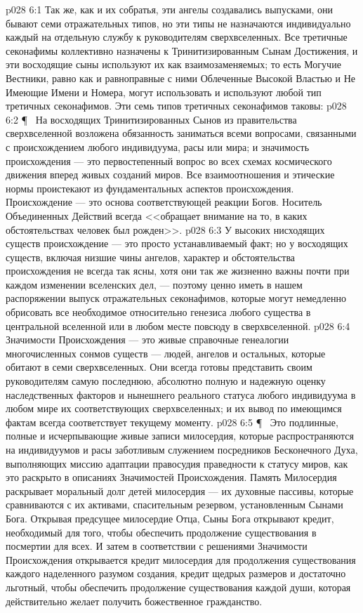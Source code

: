\vs p028 6:1 Так же, как и их собратья, эти ангелы создавались выпусками, они бывают семи отражательных типов, но эти типы не назначаются индивидуально каждый на отдельную службу к руководителям сверхвселенных. Все третичные секонафимы коллективно назначены к Тринитизированным Сынам Достижения, и эти восходящие сыны используют их как взаимозаменяемых; то есть Могучие Вестники, равно как и равноправные с ними Облеченные Высокой Властью и Не Имеющие Имени и Номера, могут использовать и используют любой тип третичных секонафимов. Эти семь типов третичных секонафимов таковы:
\vs p028 6:2 \P\ \bibnobreakspace {} На восходящих Тринитизированных Сынов из правительства сверхвселенной возложена обязанность заниматься всеми вопросами, связанными с происхождением любого индивидуума, расы или мира; и значимость происхождения --- это первостепенный вопрос во всех схемах космического движения вперед живых созданий миров. Все взаимоотношения и этические нормы проистекают из фундаментальных аспектов происхождения. Происхождение --- это основа соответствующей реакции Богов. Носитель Объединенных Действий всегда <<обращает внимание на то, в каких обстоятельствах человек был рожден>>.
\vs p028 6:3 У высоких нисходящих существ происхождение --- это просто устанавливаемый факт; но у восходящих существ, включая низшие чины ангелов, характер и обстоятельства происхождения не всегда так ясны, хотя они так же жизненно важны почти при каждом изменении вселенских дел, --- поэтому ценно иметь в нашем распоряжении выпуск отражательных секонафимов, которые могут немедленно обрисовать все необходимое относительно генезиса любого существа в центральной вселенной или в любом месте повсюду в сверхвселенной.
\vs p028 6:4 Значимости Происхождения --- это живые справочные генеалогии многочисленных сонмов существ --- людей, ангелов и остальных, которые обитают в семи сверхвселенных. Они всегда готовы представить своим руководителям самую последнюю, абсолютно полную и надежную оценку наследственных факторов и нынешнего реального статуса любого индивидуума в любом мире их соответствующих сверхвселенных; и их вывод по имеющимся фактам всегда соответствует текущему моменту.
\vs p028 6:5 \P\ \bibnobreakspace {} Это подлинные, полные и исчерпывающие живые записи милосердия, которые распространяются на индивидуумов и расы заботливым служением посредников Бесконечного Духа, выполняющих миссию адаптации правосудия праведности к статусу миров, как это раскрыто в описаниях Значимостей Происхождения. Память Милосердия раскрывает моральный долг детей милосердия --- их духовные пассивы, которые сравниваются с их активами, спасительным резервом, установленным Сынами Бога. Открывая предсущее милосердие Отца, Сыны Бога открывают кредит, необходимый для того, чтобы обеспечить продолжение существования в посмертии для всех. И затем в соответствии с решениями Значимости Происхождения открывается кредит милосердия для продолжения существования каждого наделенного разумом создания, кредит щедрых размеров и достаточно льготный, чтобы обеспечить продолжение существования каждой души, которая действительно желает получить божественное гражданство.
